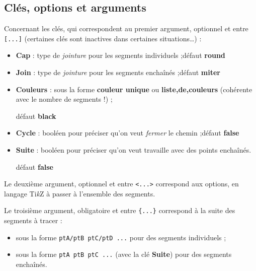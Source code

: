 \documentclass[french,a4paper,11pt]{article}
\providecommand\tikzlogo{Ti\textit{k}Z}
\let\TikZ\tikzlogo
\newcommand\Cle[1]{{\bfseries\sffamily\textlangle #1\textrangle}}
\begin{document}
\subsection{Clés, options et arguments}

\begin{tipblock}
Concernant les \textsf{clés}, qui correspondent au premier argument, optionnel et entre \texttt{[...]} (certaines clés sont inactives dans certaines situations\ldots) :

\begin{itemize}
	\item \Cle{Cap} : type de \textit{jointure} pour les segments individuels ;\hfill{}défaut \Cle{round}
	\item \Cle{Join} : type de \textit{jointure} pour les segments enchaînés ;\hfill{}défaut \Cle{miter}
	\item \Cle{Couleurs} : sous la forme \Cle{couleur unique} ou \Cle{liste,de,couleurs} (cohérente avec le nombre de segments !) ;
	
	\hfill{}défaut \Cle{black}
	\item \Cle{Cycle} : booléen pour préciser qu'on veut \textit{fermer} le chemin ;\hfill{}défaut \Cle{false}
	\item \Cle{Suite} : booléen pour préciser qu'on veut travaille avec des points enchaînés.
	
	\hfill{}défaut \Cle{false}
\end{itemize}
\vspace*{-\baselineskip}\leavevmode
\end{tipblock}

\begin{tipblock}
Le deuxième argument, optionnel et entre \texttt{<...>} correspond aux options, en langage \TikZ{} à passer à l'ensemble des segments.

\smallskip

Le troisième argument, obligatoire et entre \texttt{\{...\}} correspond à la suite des segments à tracer :

\begin{itemize}
	\item sous la forme \texttt{ptA/ptB ptC/ptD ...} pour des segments individuels ;
	\item sous la forme \texttt{ptA ptB ptC ...} (avec la clé \Cle{Suite}) pour des segments enchaînés.
\end{itemize}
\vspace*{-\baselineskip}\leavevmode
\end{tipblock}
\end{document}
